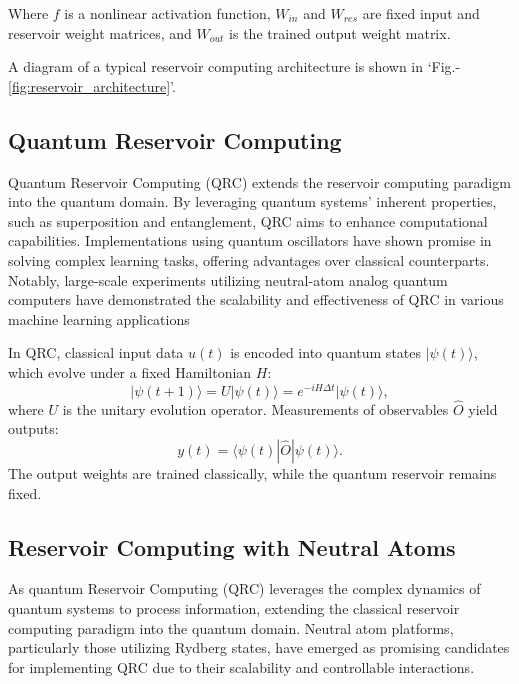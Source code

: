 \documentclass[conference]{IEEEtran}
\begin{document}

Where \( f \) is a nonlinear activation function,
\( W_{in} \) and \( W_{res} \) are fixed input and reservoir weight matrices, 
and \( W_{out} \) is the trained output weight matrix.

A diagram of a typical reservoir computing architecture is shown in `Fig.-\ref{fig:reservoir_architecture}'.




\subsection{Quantum Reservoir Computing}
Quantum Reservoir Computing (QRC) extends the reservoir 
computing paradigm into the quantum domain. By leveraging quantum systems' 
inherent properties, such as superposition and entanglement, QRC aims 
to enhance computational capabilities. Implementations using quantum 
oscillators have shown promise in solving complex learning tasks, 
offering advantages over classical counterparts. Notably, large-scale 
experiments utilizing neutral-atom analog quantum computers have demonstrated 
the scalability and effectiveness of QRC in various machine learning applications~\cite{kornjavcaLargescaleQuantumReservoir2024}


In QRC, classical input data \( u(t) \) is encoded into quantum states \( |\psi(t)\rangle \),
which evolve under a fixed Hamiltonian \( H \):
\begin{equation}
    |\psi(t+1)\rangle = U |\psi(t)\rangle = e^{-iH\Delta t} |\psi(t)\rangle,
\end{equation}
where \( U \) is the unitary evolution operator. Measurements of observables \( \hat{O} \) yield outputs:
\begin{equation}
    y(t) = \langle \psi(t) | \hat{O} | \psi(t) \rangle.
\end{equation}
The output weights are trained classically, while the quantum reservoir remains fixed.

\subsection{Reservoir Computing with Neutral Atoms}
As quantum Reservoir Computing (QRC) leverages the complex 
dynamics of quantum systems to process information, 
extending the classical reservoir computing 
paradigm into the quantum domain. Neutral atom platforms, 
particularly those utilizing Rydberg states, 
have emerged as promising candidates for implementing 
QRC due to their scalability and controllable interactions.
\end{document}
